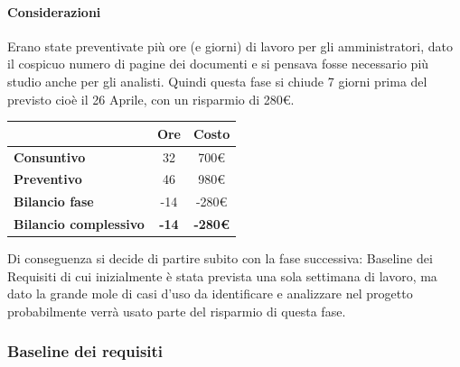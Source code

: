\paragraph{Considerazioni} \hfill \break
Erano state preventivate più ore (e giorni) di lavoro per gli amministratori, dato il cospicuo 
numero di pagine dei documenti e si pensava fosse necessario più studio anche per gli analisti.
Quindi questa fase si chiude 7 giorni prima del previsto cioè il 26 Aprile, con un risparmio di 280\euro. 
\begin{center}
	\renewcommand{\arraystretch}{1.8} %
	\begin{tabular}{ | l |c|c| }
    \hline
    & \textbf{Ore} & \textbf{Costo} \\
	\hline
    \textbf{Consuntivo} & 32 & 700\euro \\
    \hline
    \textbf{Preventivo} & 46 & 980\euro \\
    \hline
    \textbf{Bilancio fase} & -14 & -280\euro \\
    \hline
    \textbf{Bilancio complessivo} & \textbf{-14} & \textbf{-280\euro} \\
    \hline
    \end{tabular}
\end{center}

Di conseguenza si decide di partire subito con la fase successiva: Baseline dei Requisiti di cui inizialmente 
è stata prevista una sola settimana di lavoro, ma dato la grande mole di casi d'uso da identificare e 
analizzare nel progetto probabilmente verrà usato parte del risparmio di questa fase.

\subsubsection{Baseline dei requisiti}
